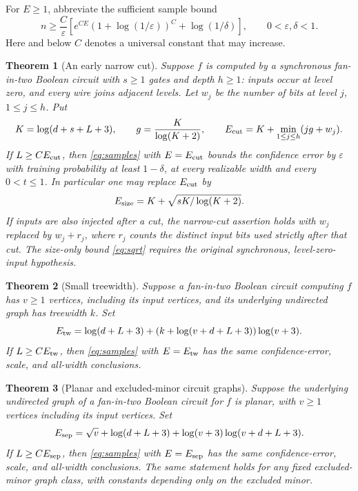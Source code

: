 \documentclass[11pt]{article}
\newtheorem{theorem}{Theorem}[section]
\theoremstyle{remark}\newtheorem{remark}[theorem]{Remark}
\begin{document}
For $E\ge1$, abbreviate the sufficient sample bound
\begin{equation}\label{eq:samples}
 n\ge \frac C\varepsilon\left[
       e^{CE}(1+\log(1/\varepsilon))^C+\log(1/\delta)\right],
 \qquad 0<\varepsilon,\delta<1.
\end{equation}
Here and below $C$ denotes a universal constant that may increase.

\begin{theorem}[An early narrow cut]\label{thm:cut}
Suppose $f$ is computed by a synchronous fan-in-two Boolean circuit
with $s\ge1$ gates and depth $h\ge1$: inputs occur at level zero,
and every wire joins adjacent levels. Let $w_j$ be the number of
bits at level $j$, $1\le j\le h$. Put
\[
 K=\log(d+s+L+3),\qquad g=\frac K{\log(K+2)},\qquad
 E_{\rm cut}=K+\min_{1\le j\le h}(jg+w_j).
\]
If $L\ge C E_{\rm cut}$, then \eqref{eq:samples} with
$E=E_{\rm cut}$ bounds the confidence error by $\varepsilon$ with
training probability at least $1-\delta$, at every realizable width
and every $0<t\le1$. In particular one may replace $E_{\rm cut}$ by
\begin{equation}\label{eq:sqrt}
 E_{\rm size}=K+\sqrt{sK/\log(K+2)}.
\end{equation}
If inputs are also injected after a cut, the narrow-cut assertion holds
with $w_j$ replaced by $w_j+r_j$, where $r_j$ counts the distinct
input bits used strictly after that cut. The size-only bound
\eqref{eq:sqrt} requires the original synchronous, level-zero-input
hypothesis.
\end{theorem}

\begin{theorem}[Small treewidth]\label{thm:tree}
Suppose a fan-in-two Boolean circuit computing $f$ has $v\ge1$
vertices, including its input vertices, and its underlying undirected
graph has treewidth $k$. Set
\[
 E_{\rm tw}=\log(d+L+3)
       +(k+\log(v+d+L+3))\log(v+3).
\]
If $L\ge C E_{\rm tw}$, then \eqref{eq:samples} with $E=E_{\rm tw}$
has the same confidence-error, scale, and all-width conclusions.
\end{theorem}

\begin{theorem}[Planar and excluded-minor circuit graphs]\label{thm:planar}
Suppose the underlying undirected graph of a fan-in-two Boolean circuit
for $f$ is planar, with $v\ge1$ vertices including its input vertices.
Set
\[
 E_{\rm sep}=\sqrt v+\log(d+L+3)
                 +\log(v+3)\log(v+d+L+3).
\]
If $L\ge C E_{\rm sep}$, then \eqref{eq:samples} with $E=E_{\rm sep}$
has the same confidence-error, scale, and all-width conclusions.
The same statement holds for any fixed excluded-minor graph class,
with constants depending only on the excluded minor.
\end{theorem}
\end{document}
